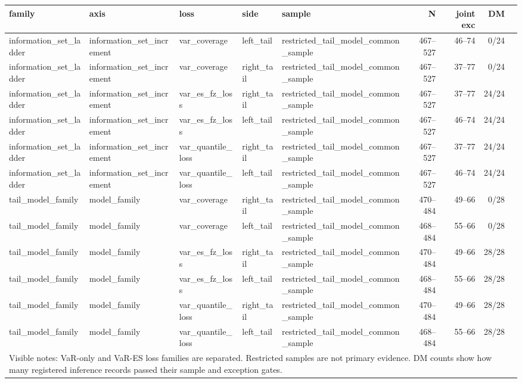 \begin{tabular}{lllllrrrr}
\toprule
family & axis & loss & side & sample & N & joint exc & DM \\
\midrule
information\_set\_ladder & information\_set\_increment & var\_coverage & left\_tail & restricted\_tail\_model\_common\_sample & 467--527 & 46--74 & 0/24 \\
information\_set\_ladder & information\_set\_increment & var\_coverage & right\_tail & restricted\_tail\_model\_common\_sample & 467--527 & 37--77 & 0/24 \\
information\_set\_ladder & information\_set\_increment & var\_es\_fz\_loss & right\_tail & restricted\_tail\_model\_common\_sample & 467--527 & 37--77 & 24/24 \\
information\_set\_ladder & information\_set\_increment & var\_es\_fz\_loss & left\_tail & restricted\_tail\_model\_common\_sample & 467--527 & 46--74 & 24/24 \\
information\_set\_ladder & information\_set\_increment & var\_quantile\_loss & right\_tail & restricted\_tail\_model\_common\_sample & 467--527 & 37--77 & 24/24 \\
information\_set\_ladder & information\_set\_increment & var\_quantile\_loss & left\_tail & restricted\_tail\_model\_common\_sample & 467--527 & 46--74 & 24/24 \\
tail\_model\_family & model\_family & var\_coverage & right\_tail & restricted\_tail\_model\_common\_sample & 470--484 & 49--66 & 0/28 \\
tail\_model\_family & model\_family & var\_coverage & left\_tail & restricted\_tail\_model\_common\_sample & 468--484 & 55--66 & 0/28 \\
tail\_model\_family & model\_family & var\_es\_fz\_loss & right\_tail & restricted\_tail\_model\_common\_sample & 470--484 & 49--66 & 28/28 \\
tail\_model\_family & model\_family & var\_es\_fz\_loss & left\_tail & restricted\_tail\_model\_common\_sample & 468--484 & 55--66 & 28/28 \\
tail\_model\_family & model\_family & var\_quantile\_loss & right\_tail & restricted\_tail\_model\_common\_sample & 470--484 & 49--66 & 28/28 \\
tail\_model\_family & model\_family & var\_quantile\_loss & left\_tail & restricted\_tail\_model\_common\_sample & 468--484 & 55--66 & 28/28 \\
\midrule
\multicolumn{8}{l}{\footnotesize Visible notes: VaR-only and VaR-ES loss families are separated. Restricted samples are not primary evidence. DM counts show how many registered inference records passed their sample and exception gates.} \\
\bottomrule
\end{tabular}
